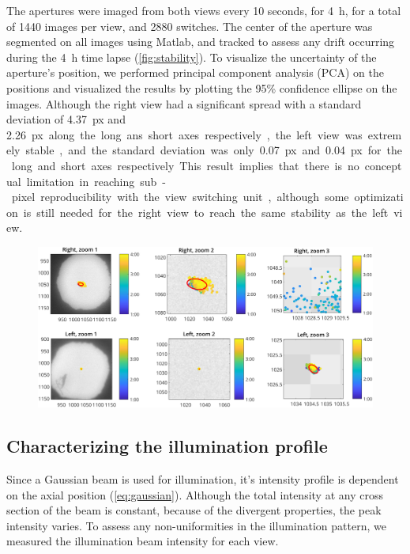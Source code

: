     The apertures were imaged from both views every 10 seconds, for \SI{4}{h}, for a total of 1440 images per view, and 2880 switches. The center of the aperture was segmented on all images using Matlab, and tracked to assess any drift occurring during the \SI{4}{h} time lapse (\autoref{fig:stability}). To visualize the uncertainty of the aperture's position, we performed principal component analysis (PCA) on the positions and visualized the results by plotting the 95\% confidence ellipse on the images. Although the right view had a significant spread with a standard deviation of \SI{4.37}{px} and \SI{2.26}px along the long ans short axes respectively, the left view was extremely stable, and the standard deviation was only \SI{0.07}{px} and \SI{0.04}{px} for the long and short axes respectively. This result implies that there is no conceptual limitation in reaching sub-pixel reproducibility with the view switching unit, although some optimization is still needed for the right view to reach the same stability as the left view. 

    \begin{figure}
      \centering
      \includegraphics[width=\textwidth]{trackCenter}
      \label{fig:stability}
    \end{figure}

  \subsection{Characterizing the illumination profile}
    Since a Gaussian beam is used for illumination, it's intensity profile is dependent on the axial position (\autoref{eq:gaussian}). Although the total intensity at any cross section of the beam is constant, because of the divergent properties, the peak intensity varies. To assess any non-uniformities in the illumination pattern, we measured the illumination beam intensity for each view.

